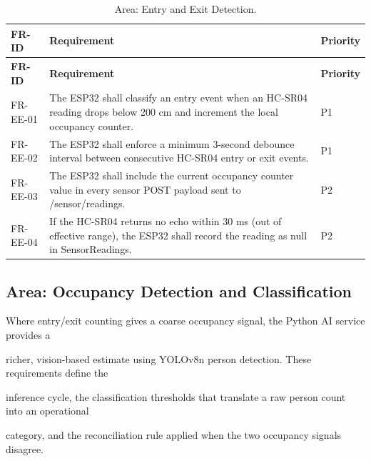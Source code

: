 \begin{longtable}{|L{2.0cm}|L{12.0cm}|L{1.5cm}|}
	\caption{Area: Entry and Exit Detection.} \label{tab:3-8}                                                                                                                \\
	\hline
	\textbf{FR-ID} & \textbf{Requirement}                                                                                                                & \textbf{Priority} \\
	\hline
	\endfirsthead
	\hline
	\textbf{FR-ID} & \textbf{Requirement}                                                                                                                & \textbf{Priority} \\
	\hline
	\endhead
	\hline
	\endfoot
	\hline
	\endlastfoot
	FR-EE-01       & The ESP32 shall classify an entry event when an HC-SR04 reading drops below 200 cm and increment the local occupancy counter.       & P1                \\
	\hline
	FR-EE-02       & The ESP32 shall enforce a minimum 3-second debounce interval between consecutive HC-SR04 entry or exit events.                      & P1                \\
	\hline
	FR-EE-03       & The ESP32 shall include the current occupancy counter value in every sensor POST payload sent to /sensor/readings.                  & P2                \\
	\hline
	FR-EE-04       & If the HC-SR04 returns no echo within 30 ms (out of effective range), the ESP32 shall record the reading as null in SensorReadings. & P2                \\
	\hline
\end{longtable}


\subsection{Area: Occupancy Detection and Classification}
Where entry/exit counting gives a coarse occupancy signal, the Python AI service provides a

richer, vision-based estimate using YOLOv8n person detection. These requirements define the

inference cycle, the classification thresholds that translate a raw person count into an operational

category, and the reconciliation rule applied when the two occupancy signals disagree.

